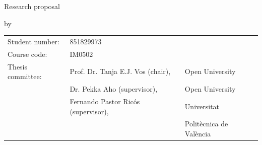 
\pagestyle{plain}
\begin{titlepage}
    \begin{center}
    
        
        \vspace*{2\bigskipamount}
        
        {\color{red}\Huge\bf \mytitle}
        \bigskip
        
        {\large Research proposal}
        
        \bigskip \bigskip
        by
        \bigskip \bigskip
        
        {\Large\bf \myauthor}
        
        \bigskip \bigskip\bigskip \bigskip
        
        \begin{tabular}{lll}
            Student number: & 851829973 \\
            Course code: & \textsc{IM}0502\\
            Thesis committee:
                & Prof. Dr. Tanja E.J. Vos (chair), & Open University \\
                & Dr. Pekka Aho (supervisor), & Open University \\
                & Fernando Pastor Ricós (supervisor), & Universitat \\
                &  & Politècnica de València
        \end{tabular}
    
    \end{center}
\end{titlepage}


\let\cleardoublepage\clearpage